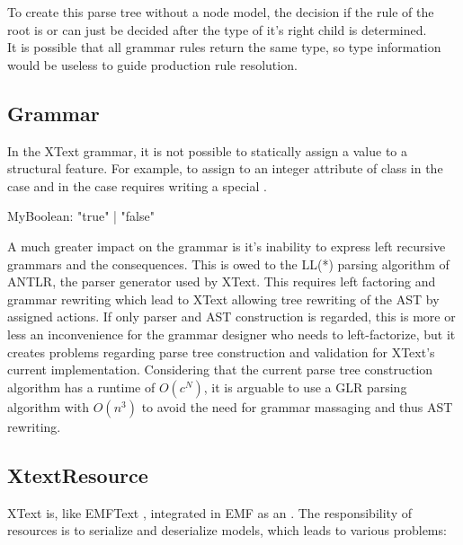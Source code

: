 To create this parse tree without a node model, the decision if the rule of the root  is  or  can just be decided after the type of it's right child  is determined. \\

It is possible that all grammar rules return the same type, so type information would be useless to guide production rule resolution.\\


\subsection{Grammar}
In the XText grammar, it is not possible to statically assign a value to a structural feature. For example, to assign  to an integer attribute  of class  in the  case and  in the  case requires writing a special . 
\begin{xtxt}
MyBoolean:  "true" | "false"
\end{xtxt}

A much greater impact on the grammar is it's inability to express left recursive grammars and the consequences. This is owed to the LL(*) parsing algorithm of ANTLR, the parser generator used by XText. This requires left factoring and grammar rewriting which lead to XText allowing tree rewriting of the AST by assigned actions. If only parser and AST construction is regarded, this is more or less an inconvenience for the grammar designer who needs to left-factorize, but it creates problems regarding parse tree construction and validation for XText's current implementation. Considering that the current parse tree construction algorithm has a runtime of $O(c^N)$, it is arguable to use a GLR parsing algorithm with $O(n^3)$ to avoid the need for grammar massaging and thus AST rewriting.

\subsection{XtextResource}
XText is, like EMFText \cite{EMFTextMan}, integrated in EMF as an . The responsibility of resources is to serialize and deserialize models, which leads to various problems: 

